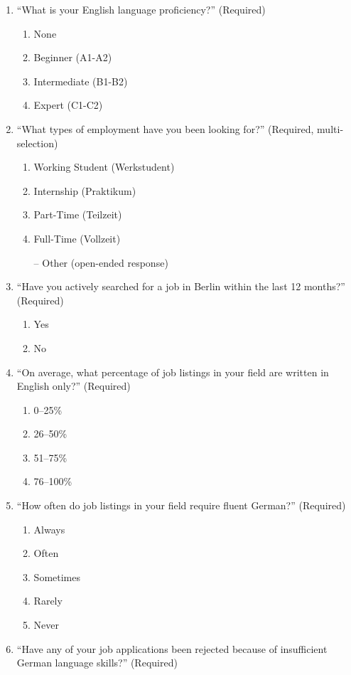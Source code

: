\begin{enumerate}
	\item “What is your English language proficiency?” (Required)
	\begin{enumerate}
		\item None
		\item Beginner (A1-A2)
		\item Intermediate (B1-B2)
		\item Expert (C1-C2)
	\end{enumerate}
	\item “What types of employment have you been looking for?” (Required, multi-selection)
	\begin{enumerate}
		\item Working Student (Werkstudent)
		\item Internship (Praktikum)
		\item Part-Time (Teilzeit)
		\item Full-Time (Vollzeit)
		\item[--] Other (open-ended response)
	\end{enumerate}
	\item ``Have you actively searched for a job in Berlin within the last 12 months?'' (Required)
	\begin{enumerate}
		\item Yes
		\item No
	\end{enumerate}
	\item ``On average, what percentage of job listings in your field are written in English only?'' (Required)
	\begin{enumerate}
		\item 0–25\%
		\item 26–50\%
		\item 51–75\%
		\item 76–100\%
	\end{enumerate}
	\item ``How often do job listings in your field require fluent German?'' (Required)
	\begin{enumerate}
		\item Always
		\item Often
		\item Sometimes
		\item Rarely
		\item Never
	\end{enumerate}
	\item ``Have any of your job applications been rejected because of insufficient German language skills?'' (Required)

\end{enumerate}

